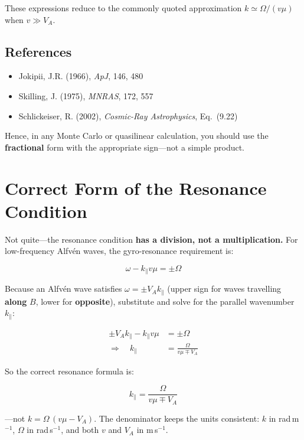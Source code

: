 These expressions reduce to the commonly quoted approximation $k \simeq \Omega / (v\mu)$ when $v \gg V_A$.

\subsection*{References}

\begin{itemize}
    \item Jokipii, J.R. (1966), \textit{ApJ}, 146, 480
    \item Skilling, J. (1975), \textit{MNRAS}, 172, 557
    \item Schlickeiser, R. (2002), \textit{Cosmic-Ray Astrophysics}, Eq.~(9.22)
\end{itemize}

\medskip

\noindent Hence, in any Monte Carlo or quasilinear calculation, you should use the \textbf{fractional} form with the appropriate sign—not a simple product.


\section*{Correct Form of the Resonance Condition}

Not quite—the resonance condition \textbf{has a division, not a multiplication.}  
For low-frequency Alfvén waves, the gyro-resonance requirement is:

\begin{equation}
\boxed{
\omega - k_\parallel v\mu = \pm\Omega
}
\end{equation}

Because an Alfvén wave satisfies $\omega = \pm V_A k_\parallel$ (upper sign for waves travelling \textbf{along} $B$, lower for \textbf{opposite}), substitute and solve for the parallel wavenumber $k_\parallel$:

\begin{align*}
\pm V_A k_\parallel - k_\parallel v\mu &= \pm\Omega \\
\Longrightarrow\quad k_\parallel &= \frac{\Omega}{v\mu \mp V_A}
\end{align*}

So the correct resonance formula is:

\begin{equation}
\boxed{
k_\parallel = \frac{\Omega}{v\mu \mp V_A}
}
\end{equation}

—not $k = \Omega\, (v\mu - V_A)$.  
The denominator keeps the units consistent: $k$ in rad\,m$^{-1}$, $\Omega$ in rad\,s$^{-1}$, and both $v$ and $V_A$ in m\,s$^{-1}$.

